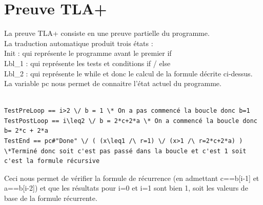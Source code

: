 \documentclass{scrreprt}
\begin{document}
\section{Preuve TLA+}
La preuve TLA+ consiste en une preuve partielle du programme.\\
La traduction automatique produit trois états :\\
Init : qui représente le programme avant le premier if\\
Lbl_1 : qui représente les tests et conditions if / else\\
Lbl_2 : qui représente le while et donc le calcul de la formule décrite ci-dessus.\\
La variable pc nous permet de connaitre l'état actuel du programme.\\
\\
\begin{lstlisting}
TestPreLoop == i>2 \/ b = 1 \* On a pas commencé la boucle donc b=1
TestPostLoop == i\leq2 \/ b = 2*c+2*a \* On a commencé la boucle donc b= 2*c + 2*a
TestEnd == pc#"Done" \/ ( (x\leq1 /\ r=1) \/ (x>1 /\ r=2*c+2*a) ) \*Terminé donc soit c'est pas passé dans la boucle et c'est 1 soit c'est la formule récursive
\end{lstlisting}

Ceci nous permet de vérifier la formule de récurrence (en admettant c==b[i-1] et a==b[i-2]) et que les résultats pour i=0 et i=1 sont bien 1, soit les valeurs de base de la formule récurrente.
\end{document}
